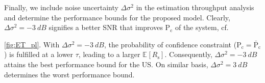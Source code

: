 \documentclass[conference, twocolumn]{IEEEtran}
\newcommand{\e}[2]{{\mathbb E}_{#1}\left[ #2 \right]}
\newcommand{\sub}[1]{_{\text{#1}}}
\newcommand{\pc}{\text{P}\sub{c}}
\newcommand{\pcd}{\bar{\text{P}}\sub{c}}
\newcommand{\rs}{R\sub{s}}
\newcommand{\ers}{\e{}{\rs}}
\newcommand{\npu}{\Delta\sigma^2}
\begin{document}
Finally, we include noise uncertainty $\npu$ in the estimation throughput analysis and determine the performance bounds for the proposed model. Clearly, $\npu = -\SI{3}{dB}$ signifies a better SNR that improves $\pc$ of the system, cf. \figurename~{\ref{fig:ET_pl}. With $\npu = -\SI{3}{dB}$, the probability of confidence constraint ($\pc = \pcd$) is fulfilled at a lower $\tau$, leading to a larger $\ers$. Consequently, $\npu = -\SI{3}{dB}$ attains the best performance bound for the US. On similar basis, $\npu = \SI{3}{dB}$ determines the worst performance bound.  

\begin{figure}[!t]

\centering
{}
\end{figure}}
\end{document}
